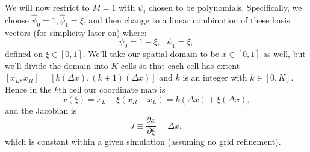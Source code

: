 \documentclass[12pt]{article}
\numberwithin{equation}{section}
\begin{document}
We will now restrict to $M = 1$ with $\psi_i$ chosen to be polynomials.
Specifically, we choose $\hat{\psi}_0 = 1, \hat{\psi}_1 = \xi$, and then change to a linear combination of these basis vectors (for simplicity later on) where:
\begin{equation}
\psi_0 = 1 - \xi, ~~~ \psi_1 = \xi,
\end{equation}
defined on $\xi \in [0,1]$.
We'll take our spatial domain to be $x \in [0, 1]$ as well, but we'll divide the domain into $K$ cells so that each cell has extent $[x_L, x_R] = [k (\Delta x), (k+1) (\Delta x)]$ and $k$ is an integer with $k \in [0,K]$.
Hence in the $k$th cell our coordinate map is
\begin{equation}
x(\xi) = x_L + \xi (x_R - x_L) = k (\Delta x) + \xi (\Delta x),
\end{equation}
and the Jacobian is
\begin{equation}
J \equiv \frac{\partial x}{\partial \xi} = \Delta x,
\end{equation}
which is constant within a given simulation (assuming no grid refinement).
\end{document}

